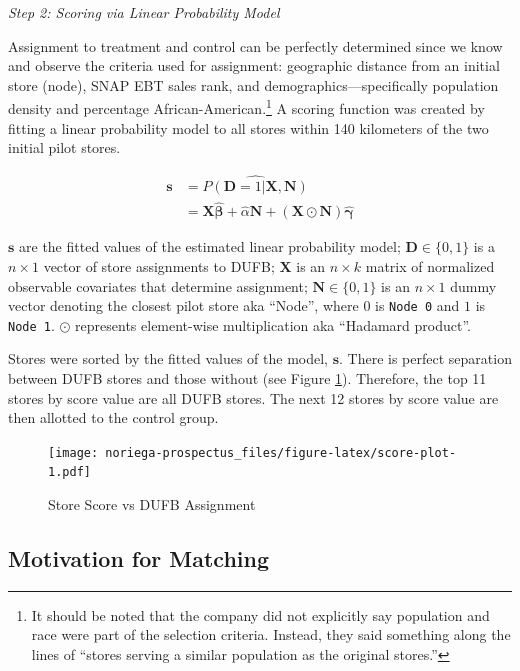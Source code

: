 \documentclass[12pt,letterpaperpaper,]{book}
\begin{document}
\emph{Step 2: Scoring via Linear Probability Model}

Assignment to treatment and control can be perfectly determined since we
know and observe the criteria used for assignment: geographic distance
from an initial store (node), SNAP EBT sales rank, and
demographics---specifically population density and percentage
African-American.\footnote{It should be noted that the company did not
  explicitly say population and race were part of the selection
  criteria. Instead, they said something along the lines of ``stores
  serving a similar population as the original stores.''} A scoring
function was created by fitting a linear probability model to all stores
within 140 kilometers of the two initial pilot stores.

\[
\begin{aligned}
  \bm{s}  &= \widehat{P(\mathbf{D} = 1 | \bm{X}, \bm{N})} \\
          &= \mathbf{X} \bm{\hat \beta} + \hat \alpha \mathbf{N} + \left (\mathbf{X} \odot \mathbf{N} \right ) \bm{\hat \gamma}
\end{aligned}
\]

\(\bm{s}\) are the fitted values of the estimated linear probability
model; \(\mathbf{D} \in \{0,1 \}\) is a \(n \times 1\) vector of store
assignments to DUFB; \(\mathbf{X}\) is an \(n \times k\) matrix of
normalized observable covariates that determine assignment;
\(\mathbf{N} \in \{0, 1 \}\) is an \(n \times 1\) dummy vector denoting
the closest pilot store aka ``Node'', where \(0\) is \texttt{Node\ 0}
and \(1\) is \texttt{Node\ 1}. \(\odot\) represents element-wise
multiplication aka ``Hadamard product''.

Stores were sorted by the fitted values of the model, \(\bm{s}\). There
is perfect separation between DUFB stores and those without (see Figure
\ref{fig:score-plot}). Therefore, the top 11 stores by score value are
all DUFB stores. The next 12 stores by score value are then allotted to
the control group.

\begin{figure}
\centering
\texttt{[image: noriega-prospectus\_files/figure-latex/score-plot-1.pdf]}
\caption{\label{fig:score-plot}Store Score vs DUFB Assignment}
\end{figure}

\subsection*{Motivation for Matching}\label{motivation-for-matching}
\end{document}
